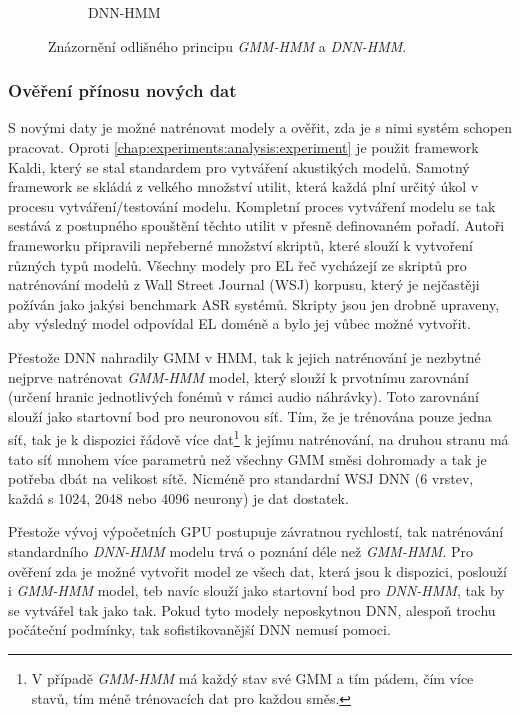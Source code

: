 \begin{figure}[htpb]
\begin{subfigure}[b]{0.4\textwidth}
    \caption{DNN-HMM}
    \label{fig:experiments:normalization:hmm:dnn}
  \end{subfigure}
  \caption{Znázornění odlišného principu \textit{GMM-HMM} a \textit{DNN-HMM}.}
  \label{fig:experiments:normalization:hmm}
\end{figure}

\subsubsection{Ověření přínosu nových dat}

S novými daty je možné natrénovat modely a ověřit, zda je s nimi systém schopen pracovat. Oproti \ref{chap:experiments:analysis:experiment} je použit framework Kaldi, který se stal standardem pro vytváření akustikých modelů. Samotný framework se skládá z velkého množství utilit, která každá plní určitý  úkol v procesu vytváření/testování modelu. Kompletní proces vytváření modelu se tak sestává z postupného spouštění těchto utilit v přesně definovaném pořadí. Autoři frameworku připravili nepřeberné množství skriptů, které slouží k vytvoření různých typů modelů. Všechny modely pro EL řeč vycházejí ze skriptů pro natrénování modelů z Wall Street Journal (WSJ) korpusu, který je nejčastěji požíván jako jakýsi benchmark ASR systémů. Skripty jsou jen drobně upraveny, aby výsledný model odpovídal EL doméně a bylo jej vůbec možné vytvořit.

Přestože DNN nahradily GMM v HMM, tak k jejich natrénování je nezbytné nejprve natrénovat \textit{GMM-HMM} model, který slouží k prvotnímu zarovnání (určení hranic jednotlivých fonémů v rámci audio náhrávky). Toto zarovnání slouží jako startovní bod pro neuronovou síť. Tím, že je trénována pouze jedna síť, tak je k dispozici řádově více dat\footnote{V případě \textit{GMM-HMM} má každý stav své GMM a tím pádem, čím více stavů, tím méně trénovacích dat pro každou směs.} k jejímu natrénování, na druhou stranu má tato síť mnohem více parametrů než všechny GMM směsi dohromady a tak je potřeba dbát na velikost sítě. Nicméně pro standardní WSJ DNN (6 vrstev, každá s 1024, 2048 nebo 4096 neurony) je dat dostatek.

Přestože vývoj výpočetních GPU postupuje závratnou rychlostí, tak natrénování standardního \textit{DNN-HMM} modelu trvá o poznání déle než \textit{GMM-HMM}. Pro ověření zda je možné vytvořit model ze všech dat, která jsou k dispozici, poslouží i \textit{GMM-HMM} model, teb navíc slouží jako startovní bod pro \textit{DNN-HMM}, tak by se vytvářel tak jako tak. Pokud tyto modely neposkytnou DNN, alespoň trochu  počáteční podmínky, tak sofistikovanější DNN nemusí pomoci.

